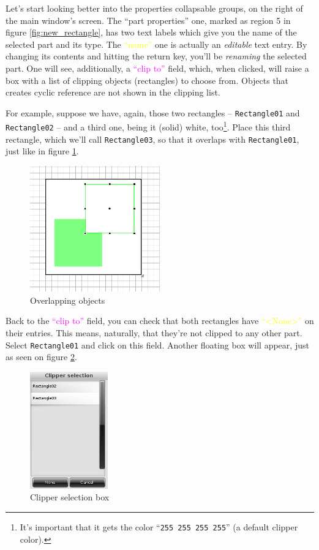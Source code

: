 \documentclass[a4paper]{profusion}
\newcommand{\GUILabel}[1]{\textcolor{magenta}{#1}}
\newcommand{\GUIEditable}[1]{\textcolor{yellow}{#1}} %
\begin{document}
Let's start looking better into the properties collapsable groups, on
the right of the main window's screen. The ``part properties'' one,
marked as region 5 in figure \ref{fig:new_rectangle}, has two text
labels which give you the name of the selected part and its type. The
\GUIEditable{``name''} one is actually an \emph{editable} text
entry. By changing its contents and hitting the return key, you'll be
\emph{renaming} the selected part. One will see, additionally, a
\GUILabel{``clip to''} field, which, when clicked, will raise a box
with a list of clipping objects (rectangles) to choose from. Objects
that creates cyclic reference are not shown in the clipping list.

For example, suppose we have, again, those two rectangles --
\texttt{Rectangle01} and \texttt{Rectangle02} -- and a third one,
being it (solid) white, too\footnote{ It's important that it gets the
  color ``\texttt{255 255 255 255}'' (a default clipper
  color).}. Place this third rectangle, which we'll call
\texttt{Rectangle03}, so that it overlaps with \texttt{Rectangle01},
just like in figure \ref{fig:overlap_white}.

\begin{figure}[h!]
  \centering
  \includegraphics[width=0.5\textwidth]{images/rectangle_overlap_white.png}
  \caption{Overlapping objects}
  \label{fig:overlap_white}
\end{figure}

Back to the \GUILabel{``clip to''} field, you can check that both
rectangles have \GUIEditable{``<None>''} on their entries. This means,
naturally, that they're not clipped to any other part. Select
\texttt{Rectangle01} and click on this field. Another floating box
will appear, just as seen on figure \ref{fig:clipping_box}.

\begin{figure}[h!]
  \centering
  \includegraphics[width=0.3\textwidth]{images/clipping_box.png}
  \caption{Clipper selection box}
  \label{fig:clipping_box}
\end{figure}
\end{document}

